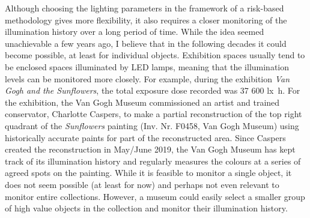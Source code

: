 Although choosing the lighting parameters in the framework of a risk-based methodology gives more flexibility, it also requires a closer monitoring of the illumination history over a long period of time. While the idea seemed unachievable a few years ago, I believe that in the following decades it could become possible, at least for individual objects. Exhibition spaces usually tend to be enclosed spaces illuminated by \gls{LED} lamps, meaning that the illumination levels can be monitored more closely. For example, during the exhibition \textit{Van Gogh and the Sunflowers}, the total exposure dose recorded was 37 600 \unit{\lux\hour}. For the exhibition, the Van Gogh Museum commissioned an artist and trained conservator, Charlotte Caspers, to make a partial reconstruction of the top right quadrant of the \textit{Sunflowers} painting (Inv. Nr. F0458, Van Gogh Museum) using historically accurate paints for part of the reconstructed area. Since Caspers created the reconstruction in May/June 2019, the Van Gogh Museum has kept track of its illumination history and regularly measures the colours at a series of agreed spots on the painting. While it is feasible to monitor a single object, it does not seem possible (at least for now) and perhaps not even relevant to monitor entire collections. However, a museum could easily select a smaller group of high value objects in the collection and monitor their illumination history. \\

